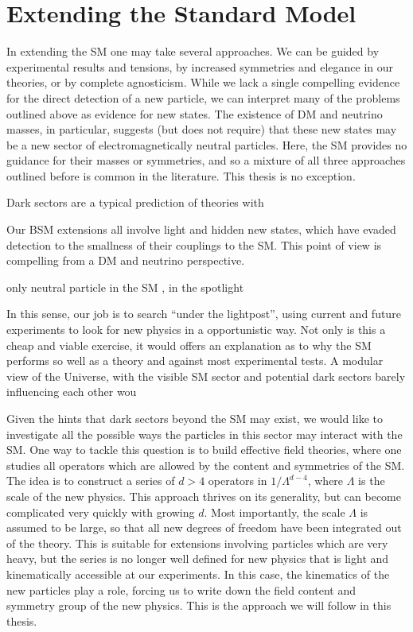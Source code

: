 \section{Extending the Standard Model}

In extending the SM one may take several approaches. We can be guided by experimental results and tensions, by increased symmetries and elegance in our theories, or by complete agnosticism. While we lack a single compelling evidence for the direct detection of a new particle, we can interpret many of the problems outlined above as evidence for new states. The existence of DM and neutrino masses, in particular, suggests (but does not require) that these new states may be a new sector of electromagnetically neutral particles. Here, the SM provides no guidance for their masses or symmetries, and so a mixture of all three approaches outlined before is common in the literature. This thesis is no exception.

Dark sectors are a typical prediction of theories with 


Our BSM extensions all involve light and hidden new states, which have evaded detection to the smallness of their couplings to the SM. This point of view is compelling from a DM and neutrino perspective.

only neutral particle in the SM , in the spotlight 

In this sense, our job is to search ``under the lightpost'', using current and future experiments to look for new physics in a opportunistic way. Not only is this a cheap and viable exercise, it would offers an explanation as to why the SM performs so well as a theory and against most experimental tests. A modular view of the Universe, with the visible SM sector and potential dark sectors barely influencing each other wou

Given the hints that dark sectors beyond the SM may exist, we would like to investigate all the possible ways the particles in this sector may interact with the SM. One way to tackle this question is to build effective field theories, where one studies all operators which are allowed by the content and symmetries of the SM. The idea is to construct a series of $d>4$ operators in $1/\Lambda^{d-4}$, where $\Lambda$ is the scale of the new physics. This approach thrives on its generality, but can become complicated very quickly with growing $d$. Most importantly, the scale $\Lambda$ is assumed to be large, so that all new degrees of freedom have been integrated out of the theory. This is suitable for extensions involving particles which are very heavy, but the series is no longer well defined for new physics that is light and kinematically accessible at our experiments. In this case, the kinematics of the new particles play a role, forcing us to write down the field content and symmetry group of the new physics. This is the approach we will follow in this thesis.

